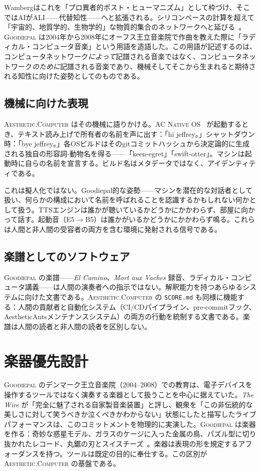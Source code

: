 \documentclass[10pt,letterpaper,twocolumn]{article}
\newcommand{\ac}{\textsc{Aesthetic.Computer}}
\newcommand{\acos}{\textsc{AC Native OS}}
\newcommand{\gp}{\textsc{Goodiepal}}
\begin{document}
Wambergはこれを「プロ異者的ポスト・ヒューマニズム」として枠づけ、そこではAIがALI——代替知性——へと拡張される。シリコンベースの計算を超えて「宇宙的、地質学的、生物学的」な物質的集合のネットワークへと延びる~\citep{wamberg2022artforaliens}。\gp{} は2004年から2008年にオーフス王立音楽院で作曲を教えた際に「ラディカル・コンピュータ音楽」という用語を造語した。この用語が記述するのは、コンピュータネットワーク\emph{によって}記譜される音楽ではなく、コンピュータネットワーク\emph{のために}記譜される音楽であり、機械そしてそこから生まれると期待される知性に向けた姿勢としてのものである。

\subsection{機械に向けた表現}

\ac{} はその機械に語りかける。\acos{}~\citep{scudder2026os} が起動するとき、テキスト読み上げで所有者の名前を声に出す：「hi jeffrey。」シャットダウン時：「bye jeffrey。」各OSビルドはそのgitコミットハッシュから決定論的に生成される独自の形容詞-動物名を得る——「keen-egret」「swift-otter」。マシンは起動時に自らの名前を宣言する。ビルド名はメタデータではなく、アイデンティティである。

これは擬人化ではない。Goodiepal的な姿勢——マシンを潜在的な対話者として扱い、何らかの構成において名前を呼ばれることを認識するかもしれない何かとして扱う。TTSエンジンは誰かが聴いているかどうかにかかわらず、部屋に向かって話す。起動音（E5$\rightarrow$B5）は誰かがいるかどうかにかかわらず鳴る。これらは人間と非人間の受容者の両方を含む環境に発射される信号である。

\subsection{楽譜としてのソフトウェア}

\gp{} の楽譜——\emph{El Camino}、\emph{Mort aux Vaches} 録音、ラディカル・コンピュータ講義——は人間の演奏者への指示ではない。解釈能力を持つあらゆるシステムに向けた文書である。\ac{} の \texttt{SCORE.md} も同様に機能する：人間の貢献者と自動化システム（CI/CDパイプライン、pre-commitフック、AestheticAntsメンテナンスシステム）の両方の行動を統制する文書である。楽譜は人間の読者と非人間の読者を区別しない。

\section{楽器優先設計}

\gp{} のデンマーク王立音楽院（2004--2008）での教育は、電子デバイスを操作するツールではなく演奏する楽器として扱うことを中心に据えていた。\emph{The Wire} が「完全に魅了される自家製音楽装置」と評し、観衆を「この非伝統的な美しさに対して笑うべきか泣くべきかわからない」状態にしたと描写したライブパフォーマンスは、このコミットメントを物理的に実演した。\gp{} は楽器を作る：奇妙な惑星モデル、ガラスのケージに入った金属の鳥、パズル型に切り抜かれたレコード、丸鋸の刃とスイスチーズ~\citep{inspite2024goodiepal}。楽器は表現の形を規定するアフォーダンスを持つ。ツールは既定の目的に奉仕する。この区別が \ac{} の基盤である。
\end{document}
